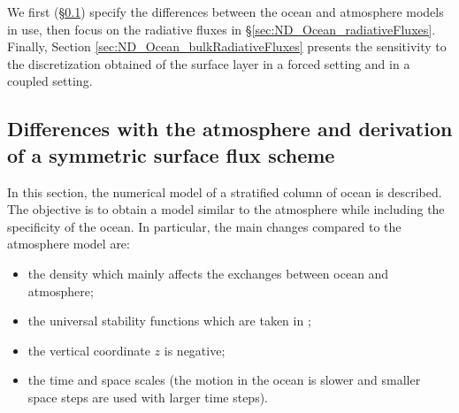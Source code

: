 We first (\S \ref{sec:ND_Ocean_differencesWithAtmosphere})
specify the differences between the ocean and
atmosphere models in use,
then focus on the radiative fluxes in
\S \ref{sec:ND_Ocean_radiativeFluxes}.
Finally, Section \ref{sec:ND_Ocean_bulkRadiativeFluxes}
presents the sensitivity to the discretization obtained of the
surface layer in a forced setting and in a coupled setting.
\subsection{Differences with the atmosphere and derivation of
	a symmetric surface flux scheme}
\label{sec:ND_Ocean_differencesWithAtmosphere}
In this section, the numerical model of a stratified column
of ocean is described. The objective is to obtain a model
similar to the atmosphere while including the specificity
of the ocean.
In particular, the main changes compared to the atmosphere
model are:
\begin{itemize}
	\item the density which mainly affects the exchanges
		between ocean and atmosphere;
	\item the universal stability functions which are
		taken in \citep{large_similarity_2019};
	\item the vertical coordinate $z$ is negative;
	\item the time and space scales (the motion in the ocean
		is slower and smaller space steps are used with
		larger time steps).
\end{itemize}
